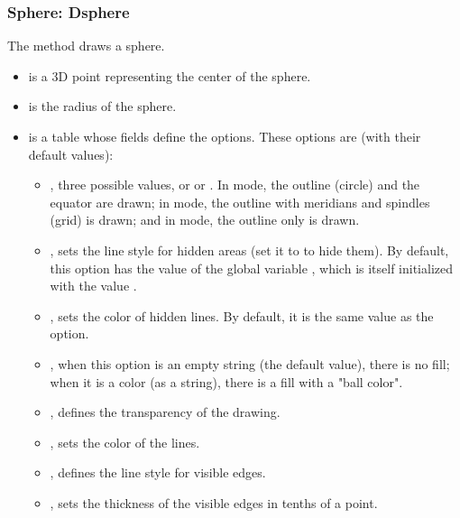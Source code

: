 \subsubsection{ Sphere: Dsphere}

The  method draws a sphere.

\begin{itemize}
    \item {} is a 3D point representing the center of the sphere.
    \item {} is the radius of the sphere.
    \item {} is a table whose fields define the options. These options are (with their default values):
\begin{itemize}
    \item {}, three possible values,  or  or . In  mode, the outline (circle) and the equator are drawn; in  mode, the outline with meridians and spindles (grid) is drawn; and in  mode, the outline only is drawn.

    \item {}, sets the line style for hidden areas (set it to  to hide them). By default, this option has the value of the global variable , which is itself initialized with the value .

    \item {}, sets the color of hidden lines. By default, it is the same value as the  option.

    \item {}, when this option is an empty string (the default value), there is no fill; when it is a color (as a string), there is a fill with a "ball color".

    \item {}, defines the transparency of the drawing.
    
    \item {}, sets the color of the lines.    

    \item {}, defines the line style for visible edges.

    \item {}, sets the thickness of the visible edges in tenths of a point.
\end{itemize}
\end{itemize}


